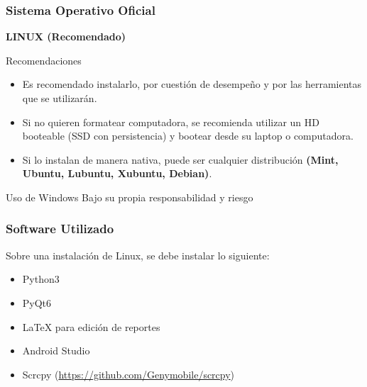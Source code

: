 \begin{frame}
\frametitle{Sistema Operativo Oficial}

\textbf{LINUX (Recomendado)}
\begin{block}{Recomendaciones}
\begin{itemize}
\item Es recomendado instalarlo, por cuestión de desempeño y por las herramientas que se utilizarán.
\item Si no quieren formatear computadora, se recomienda utilizar un HD booteable (SSD con persistencia) y bootear desde su laptop o computadora.
\item Si lo instalan de manera nativa, puede ser cualquier distribución \textbf{(Mint, Ubuntu, Lubuntu, Xubuntu, Debian)}.
\end{itemize}
\end{block}
\begin{block}{Uso de Windows}
Bajo su propia responsabilidad y riesgo
\end{block}
\end{frame}


\begin{frame}
\frametitle{Software Utilizado}
Sobre una instalación de Linux, se debe instalar lo siguiente:
\begin{itemize}
\item Python3
\item PyQt6
\item LaTeX para edición de reportes
\item Android Studio
\item Scrcpy (\url{https://github.com/Genymobile/scrcpy})
\end{itemize}
\end{frame}

